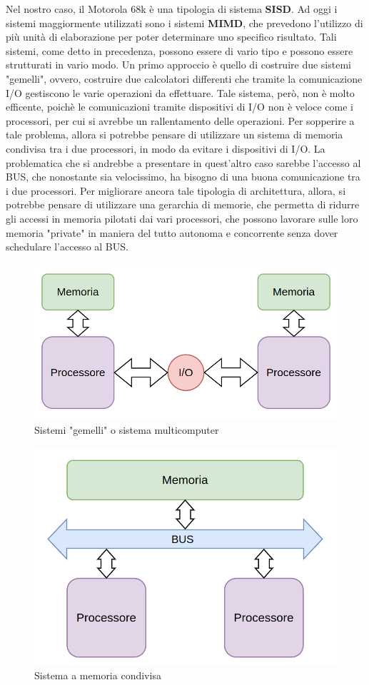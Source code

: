 Nel nostro caso, il Motorola 68k è una tipologia di sistema \textbf{SISD}.
Ad oggi i sistemi maggiormente utilizzati sono i sistemi \textbf{MIMD}, che prevedono l'utilizzo di più unità di elaborazione per poter determinare uno specifico risultato. Tali sistemi, come detto in precedenza, possono essere di vario tipo e possono essere strutturati in vario modo.
Un primo approccio è quello di costruire due sistemi "gemelli", ovvero, costruire due calcolatori differenti che tramite la comunicazione I/O gestiscono le varie operazioni da effettuare. Tale sistema, però, non è molto efficente, poichè le comunicazioni tramite dispositivi di I/O non è veloce come i processori, per cui si avrebbe un rallentamento delle operazioni.
Per sopperire a tale problema, allora si potrebbe pensare di utilizzare un sistema di memoria condivisa tra i due processori, in modo da evitare i dispositivi di I/O. La problematica che si andrebbe a presentare in quest'altro caso sarebbe l'accesso al BUS, che nonostante sia velocissimo, ha bisogno di una buona comunicazione tra i due processori.
Per migliorare ancora tale tipologia di architettura, allora, si potrebbe pensare di utilizzare una gerarchia di memorie, che permetta di ridurre gli accessi in memoria pilotati dai vari processori, che possono lavorare sulle loro memoria "private" in maniera del tutto autonoma e concorrente senza dover schedulare l'accesso al BUS.

\begin{figure}
    \centering
    \includegraphics[width=.5\textwidth]{img/P-IO-P.png}
    \caption{Sistemi "gemelli" o sistema multicomputer}\label{img:multi-computer}
\end{figure}

\begin{figure}
    \centering
    \includegraphics[width=.5\textwidth]{img/P-BUS-P.png}
    \caption{Sistema a memoria condivisa}\label{img:shared-memory}
\end{figure}

